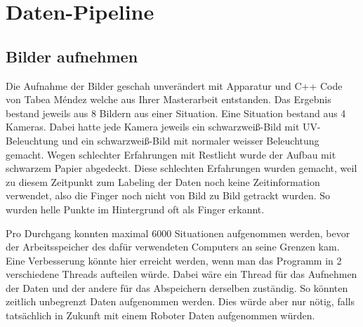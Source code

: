 \newpage
\section{Daten-Pipeline}
\label{chapter:daten_pipeline}
\subsection{Bilder aufnehmen}
\label{chapter:bilder_aufnehmen}
Die Aufnahme der Bilder geschah unverändert mit Apparatur und C++ Code von Tabea Méndez welche aus Ihrer Masterarbeit \cite{TabeasFingertracking} entstanden. 
Das Ergebnis bestand jeweils aus 8 Bildern aus einer Situation. 
Eine Situation bestand aus 4 Kameras.
Dabei hatte jede Kamera jeweils ein schwarzweiß-Bild mit UV-Beleuchtung und ein schwarzweiß-Bild mit normaler weisser Beleuchtung gemacht.
Wegen schlechter Erfahrungen mit Restlicht wurde der Aufbau mit schwarzem Papier abgedeckt. 
Diese schlechten Erfahrungen wurden gemacht, weil zu diesem Zeitpunkt zum Labeling der Daten noch keine Zeitinformation verwendet, also die Finger noch nicht von Bild zu Bild getrackt wurden.
So wurden helle Punkte im Hintergrund oft als Finger erkannt.

Pro Durchgang konnten maximal 6000 Situationen aufgenommen werden, bevor der Arbeitsspeicher des dafür verwendeten Computers an seine Grenzen kam. 
Eine Verbesserung könnte hier erreicht werden, wenn man das Programm in 2 verschiedene Threads aufteilen würde.
Dabei wäre ein Thread für das Aufnehmen der Daten und der andere für das Abspeichern derselben zuständig.
So könnten \grqq{}zeitlich unbegrenzt\grqq{} Daten aufgenommen werden. 
Dies würde aber nur nötig, falls tatsächlich in Zukunft mit einem Roboter Daten aufgenommen würden.


